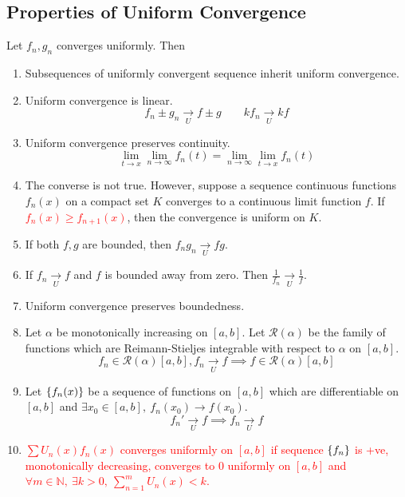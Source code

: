\subsection{Properties of Uniform Convergence}
		Let $f_n,g_n$ converges uniformly. Then
\begin{enumerate}
	\item Subsequences of uniformly convergent sequence inherit uniform convergence.
	\item Uniform convergence is linear.
	$$f_n \pm g_n \underset{U}\to f \pm g \qquad kf_n \underset{U}{\to} kf$$
	\item Uniform convergence preserves continuity.
	$$\lim_{t \to x} \lim_{n \to \infty} f_n(t) = \lim_{n \to \infty} \lim_{t \to x} f_n(t)$$
\item The converse is not true. However, suppose a sequence continuous functions $f_n(x)$ on a compact set $K$ converges to a continuous limit function $f$. If \textcolor{red}{$f_n(x) \ge f_{n+1}(x)$}, then the convergence is uniform on $K$.%
	\item If both $f,g$ are bounded, then $f_ng_n \underset{U}{\to} fg$.
	\item If $f_n \underset{U}{\to} f$ and $f$ is bounded away from zero. Then $\frac{1}{f_n} \underset{U}{\to} \frac{1}{f}$.
	\item Uniform convergence preserves boundedness.
	\item Let $\alpha$ be monotonically increasing on $[a,b]$. Let $\mathscr{R}(\alpha)$ be the family of functions which are Reimann-Stieljes integrable with respect to $\alpha$ on $[a,b]$.
	$$f_n \in \mathscr{R}(\alpha)[a,b], f_n \underset{U}{\to} f \implies f \in \mathscr{R}(\alpha)[a,b]$$
	\item Let $\{f_n(x)\}$ be a sequence of functions on $[a,b]$ which are differentiable on $[a,b]$ and $\exists x_0 \in [a,b],\ f_n(x_0) \to f(x_0)$.
	$$f_n' \underset{U}{\to} f \implies f_n \underset{U}{\to} f$$
\item \textcolor{red}{$\sum U_n(x) f_n(x)$ converges uniformly on $[a,b]$ if sequence $\{f_n\}$ is +ve, monotonically decreasing, converges to $0$ uniformly on $[a,b]$ and $\forall m \in \mathbb{N},\ \exists k > 0,\ \sum_{n=1}^m U_n(x) < k$.}
\end{enumerate}

